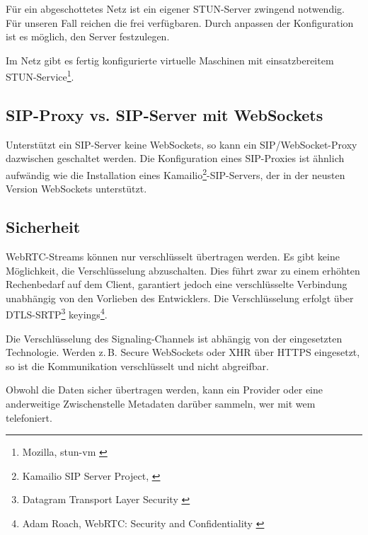 		Für ein abgeschottetes Netz ist ein eigener STUN-Server zwingend notwendig.
		Für unseren Fall reichen die frei verfügbaren. Durch anpassen der
		Konfiguration ist es möglich, den Server festzulegen.

		Im Netz gibt es fertig konfigurierte virtuelle Maschinen mit einsatzbereitem
		STUN-Service\footnote{Mozilla, stun-vm \cite{Mozilla-STUN-VM}}.
		
			\subsection{SIP-Proxy vs. SIP-Server mit WebSockets}
		Unterstützt ein SIP-Server keine WebSockets, so kann ein SIP/WebSocket-Proxy
		dazwischen geschaltet werden. Die Konfiguration eines SIP-Proxies ist ähnlich
		aufwändig wie die Installation eines Kamailio\footnote{Kamailio SIP Server
		Project, \cite{Kamailio-Project}}-SIP-Servers, der in der neusten Version WebSockets unterstützt.

	\subsection{Sicherheit}
		WebRTC-Streams können nur verschlüsselt übertragen werden. Es gibt keine
		Möglichkeit, die Verschlüsselung abzuschalten. Dies führt zwar zu einem
		erhöhten Rechenbedarf auf dem Client, garantiert jedoch eine verschlüsselte
		Verbindung unabhängig von den Vorlieben des Entwicklers.
		Die Verschlüsselung erfolgt über DTLS-SRTP\footnote{Datagram Transport Layer
		Security \cite{IETF-DTLS-RFC}} keyings\footnote{Adam Roach, WebRTC: Security and Confidentiality \cite{AdamRoach-WebRTC-Security}}. 
		
		Die Verschlüsselung des Signaling-Channels ist abhängig von der eingesetzten
		Technologie. Werden z.\,B. Secure WebSockets oder XHR über HTTPS eingesetzt,
		so ist die Kommunikation verschlüsselt und nicht abgreifbar.
		
		Obwohl die Daten sicher übertragen werden, kann ein Provider oder eine anderweitige Zwischenstelle Metadaten darüber sammeln, wer mit wem telefoniert.
		
		